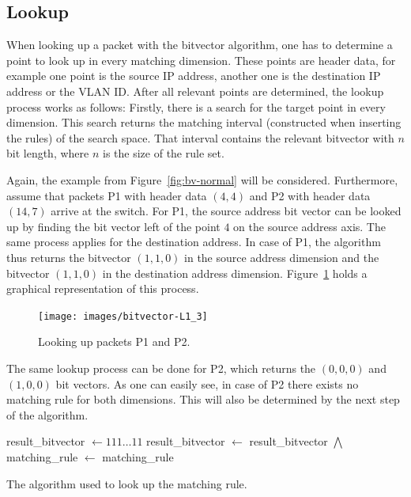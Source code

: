 \documentclass[a4paper,
		12pt,
		parskip=full,
		titlepage
		]{scrartcl}
\begin{document}
\subsection{Lookup}
When looking up a packet with the bitvector algorithm, one has to determine a point to look up in every matching dimension.
These points are header data, for example one point is the source IP address, another one is the destination IP address or the VLAN ID.
After all relevant points are determined, the lookup process works as follows:
Firstly, there is a search for the target point in every dimension.
This search returns the matching interval (constructed when inserting the rules) of the search space.
That interval contains the relevant bitvector with $n$ bit length, where $n$ is the size of the rule set.

Again, the example from Figure~\ref{fig:bv-normal} will be considered.
Furthermore, assume that packets P1 with header data $(4, 4)$ and P2 with header data $(14, 7)$ arrive at the switch.
For P1, the source address bit vector can be looked up by finding the bit vector left of the point $4$ on the source address axis.
The same process applies for the destination address.
In case of P1, the algorithm thus returns the bitvector $(1, 1, 0)$ in the 
source address dimension and the bitvector $(1, 1, 0)$ in the destination address dimension.
Figure~\ref{fig:bv-lookup} holds a graphical representation of this process.

\begin{figure}
\centering
\texttt{[image: images/bitvector-L1\_3]}
\caption{Looking up packets P1 and P2.}
\label{fig:bv-lookup}
\end{figure}

The same lookup process can be done for P2, which returns the $(0, 0, 0)$ and $(1, 0, 0)$ bit vectors.
As one can easily see, in case of P2 there exists no matching rule for both dimensions.
This will also be determined by the next step of the algorithm.

\begin{algorithm}
\begin{algorithmic}[1]
    \State result\_bitvector $\gets 111\ldots 11$
        \State result\_bitvector $\gets$ result\_bitvector $\bigwedge$ 
    \EndFor
    \State matching\_rule $\gets$ 
    \State \Return matching\_rule
\EndFunction
\end{algorithmic}
\caption{The algorithm used to look up the matching rule.}
\label{alg:bv-join}
\end{algorithm}
\end{document}
